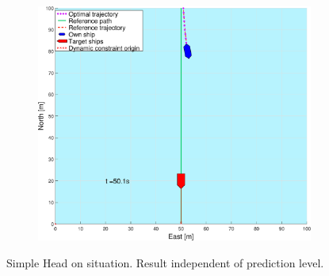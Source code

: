 \begin{figure}[ht!]
\begin{subfigure}[b]{0.49\textwidth}
        \subcaption{}
    \end{subfigure}
    \hfill
    \begin{subfigure}[b]{0.499\textwidth}
        \centering
        \includegraphics[width=\textwidth]{Images/Figures/enkel_HO/_Simple_0fig999_time=50}
        \subcaption{}
    \end{subfigure}
    \hfill
    \caption{Simple Head on situation. Result independent of prediction level.}
    \label{FIG: Simple HO}
\end{figure}%

